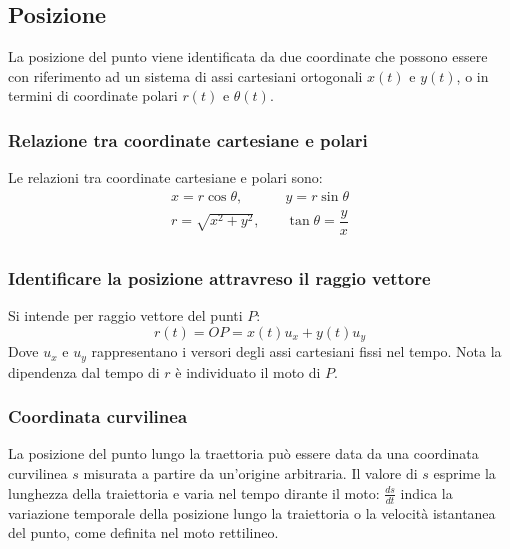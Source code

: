 	\subsection{Posizione}
	La posizione del punto viene identificata da due coordinate che possono essere con riferimento ad un sistema di assi cartesiani ortogonali $x(t)$ e $y(t)$, o in termini di coordinate polari $r(t)$ e $\theta(t)$.

		\subsubsection{Relazione tra coordinate cartesiane e polari}
		Le relazioni tra coordinate cartesiane e polari sono:
		\begin{align*}
			x = r\cos\theta,\qquad&y=r\sin\theta\\
			r=\sqrt{x^2+y^2},\quad &\tan\theta=\dfrac{y}{x}\\
		\end{align*}

		\subsubsection{Identificare la posizione attravreso il raggio vettore}
		Si intende per raggio vettore del punti $P$:
		$$r(t)=OP=x(t)u_x+y(t)u_y$$
		Dove $u_x$ e $u_y$ rappresentano i versori degli assi cartesiani fissi nel tempo.
		Nota la dipendenza dal tempo di $r$ \`e individuato il moto di $P$.

		\subsubsection{Coordinata curvilinea}
		La posizione del punto lungo la traettoria pu\`o essere data da una coordinata curvilinea $s$ misurata a partire da un'origine arbitraria.
		Il valore di $s$ esprime la lunghezza della traiettoria e varia nel tempo dirante il moto: $\frac{ds}{dt}$ indica la variazione temporale della posizione lungo la traiettoria o la velocit\`a istantanea del punto, come definita nel moto rettilineo.

